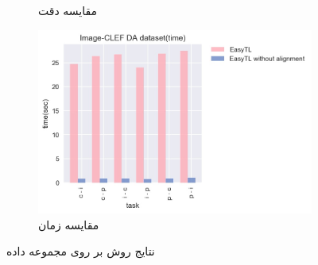 \begin{figure}[H]
\begin{subfigure}[b]{0.3\textwidth}
		\caption{مقایسه دقت}
	\end{subfigure}%
	\begin{subfigure}[b]{0.3\textwidth}
		\centering
		\includegraphics[width=\linewidth]{images/2_3.jpg}
		\caption{مقایسه زمان}
	\end{subfigure}%
	\caption{
		نتایج روش
		بر روی مجموعه داده
		\textit{}
	}
	\label{fig:2}
\end{figure}

